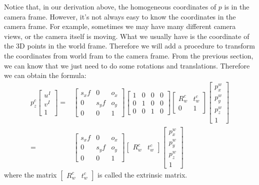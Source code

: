 \documentclass[
]{book}
\theoremstyle{definition}
\theoremstyle{definition}
\theoremstyle{definition}
\theoremstyle{definition}
\theoremstyle{remark}
\begin{document}
Notice that, in our derivation above, the homogeneous coordinates of \(p\) is in the camera frame. However, it's not always easy to know the coordinates in the camera frame. For example, sometimes we may have many different camera views, or the camera itself is moving. What we usually have is the coordinate of the 3D points in the world frame. Therefore we will add a procedure to transform the coordinates from world fram to the camera frame. From the previous section, we can know that we just need to do some rotations and translations. Therefore we can obtain the formula:
\begin{align} p_z^c\begin{bmatrix} u^I\\v^I\\1 \end{bmatrix} 
=&  \begin{bmatrix} s_xf &0 &o_x \\ 0 &s_yf &o_y\\ 0 &0 &1\end{bmatrix} \begin{bmatrix} 1 &0 &0 &0 \\ 0 &1 &0 &0\\ 0 &0 &1 &0\end{bmatrix} \begin{bmatrix} R_w^c &t^c_w \\ 0 &1 \end{bmatrix}\begin{bmatrix} p_x^w\\p_y^w\\p_z^w\\1 \end{bmatrix}\\
=& \begin{bmatrix} s_xf &0 &o_x \\ 0 &s_yf &o_y\\ 0 &0 &1\end{bmatrix} \begin{bmatrix} R_w^c &t^c_w\end{bmatrix}\begin{bmatrix} p_x^w\\p_y^w\\p_z^w\\1 \end{bmatrix}
\end{align}
where the matrix \(\begin{bmatrix} R_w^c &t^c_w\end{bmatrix}\) is called the extrinsic matrix.
\end{document}
